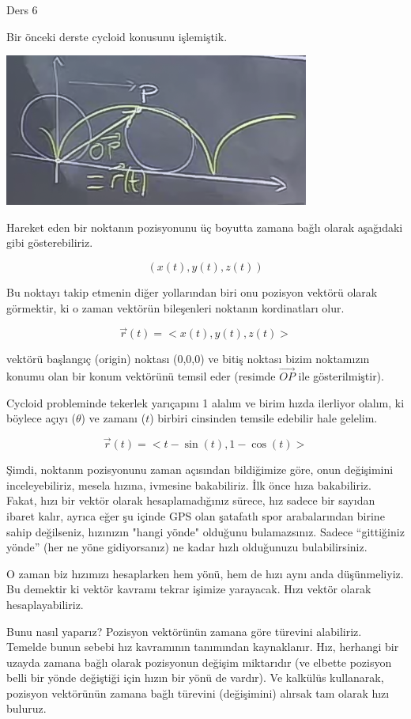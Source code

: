 \documentclass[12pt,fleqn]{article}\usepackage{../../common}
\begin{document}
Ders 6

Bir önceki derste cycloid konusunu işlemiştik. 

\begin{center}
\includegraphics[height=5cm]{6_1.png}
\end{center}

Hareket eden bir noktanın pozisyonunu üç boyutta zamana bağlı olarak aşağıdaki
gibi gösterebiliriz.

$$ (x(t), y(t), z(t)) $$

Bu noktayı takip etmenin diğer yollarından biri onu pozisyon vektörü
olarak görmektir, ki o zaman vektörün bileşenleri noktanın kordinatları olur. 

$$ 
\vec{r}(t) = < x(t),y(t),z(t) > 
$$

vektörü başlangıç (origin) noktası (0,0,0) ve bitiş noktası bizim noktamızın
konumu olan bir konum vektörünü temsil eder (resimde $\vec{OP}$ ile
gösterilmiştir).

Cycloid probleminde tekerlek yarıçapını 1 alalım ve birim hızda ilerliyor
olalım, ki böylece açıyı ($\theta$) ve zamanı ($t$) birbiri cinsinden temsile
edebilir hale gelelim.

$$ \vec{r}(t) = < t-\sin(t), 1-\cos(t) >$$

Şimdi, noktanın pozisyonunu zaman açısından bildiğimize göre, onun değişimini
inceleyebiliriz, mesela hızına, ivmesine bakabiliriz. İlk önce hıza
bakabiliriz. Fakat, hızı bir vektör olarak hesaplamadığınız sürece, hız sadece
bir sayıdan ibaret kalır, ayrıca eğer şu içinde GPS olan şatafatlı spor
arabalarından birine sahip değilseniz, hızınızın "hangi yönde" olduğunu
bulamazsınız. Sadece ``gittiğiniz yönde'' (her ne yöne gidiyorsanız) ne kadar
hızlı olduğunuzu bulabilirsiniz.

O zaman biz hızımızı hesaplarken hem yönü, hem de hızı aynı anda düşünmeliyiz. 
Bu demektir ki vektör kavramı tekrar işimize yarayacak. Hızı
vektör olarak hesaplayabiliriz. 

Bunu nasıl yaparız? Pozisyon vektörünün zamana göre türevini alabiliriz. Temelde 
bunun sebebi hız kavramının tanımından kaynaklanır. Hız, herhangi bir uzayda 
zamana bağlı olarak pozisyonun değişim miktarıdır (ve elbette pozisyon belli bir 
yönde değiştiği için hızın bir yönü de vardır). Ve kalkülüs kullanarak, pozisyon 
vektörünün zamana bağlı türevini (değişimini) alırsak tam olarak hızı buluruz.
\end{document}
